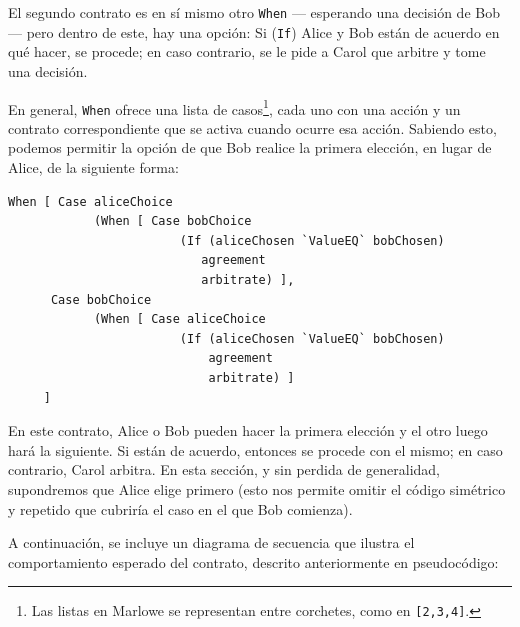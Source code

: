 \documentclass[12pt]{book}
\begin{document}
El segundo contrato es en sí mismo otro \texttt{When} --- esperando una decisión de Bob --- pero dentro de este, hay una opción: Si (\texttt{If}) Alice y Bob están de acuerdo en qué hacer, se procede; en caso contrario, se le pide a Carol que arbitre y tome una decisión.

En general, \texttt{When} ofrece una lista de casos\footnote{Las listas en Marlowe se representan entre corchetes, como en \texttt{[2,3,4]}.}, cada uno con una acción y un contrato correspondiente que se activa cuando ocurre esa acción. Sabiendo esto, podemos permitir la opción de que Bob realice la primera elección, en lugar de Alice, de la siguiente forma:

\begin{lstlisting}[style=Haskell-cardano, language=Marlowe, caption=Pseudocódigo agnóstico al orden de las elecciones.]
When [ Case aliceChoice
            (When [ Case bobChoice
                        (If (aliceChosen `ValueEQ` bobChosen)
                           agreement
                           arbitrate) ],
      Case bobChoice
            (When [ Case aliceChoice
                        (If (aliceChosen `ValueEQ` bobChosen)
                            agreement
                            arbitrate) ]
     ]
\end{lstlisting}

En este contrato, Alice o Bob pueden hacer la primera elección y el otro luego hará la siguiente. Si están de acuerdo, entonces se procede con el mismo; en caso contrario, Carol arbitra. En esta sección, y sin perdida de generalidad, supondremos que Alice elige primero (esto nos permite omitir el código simétrico y repetido que cubriría el caso en el que Bob comienza).

A continuación, se incluye un diagrama de secuencia que ilustra el comportamiento esperado del contrato, descrito anteriormente en pseudocódigo:
\end{document}
